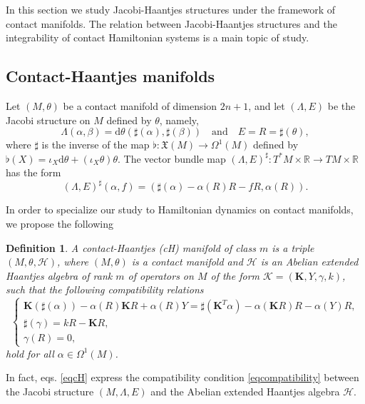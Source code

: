 \documentclass[10pt]{amsart}
\numberwithin{equation}{section}
\newcommand{\rd}{\mathrm{d}}
\newcommand{\bs}{\boldsymbol}
\newtheorem{definition}{Definition}
\theoremstyle{definition}
\begin{document}
In this section we study Jacobi-Haantjes structures under the framework of contact manifolds. The relation between Jacobi-Haantjes structures and the integrability of contact Hamiltonian systems is a main topic of study.



\subsection{Contact-Haantjes manifolds}
Let $(M,\theta)$ be a contact manifold of dimension $2n+1$, and let $(\Lambda,E)$ be the Jacobi structure on $M$ defined by $\theta$, namely,
\begin{equation}
\Lambda(\alpha,\beta)=\rd \theta(\sharp(\alpha),\sharp(\beta))\quad\text{and}\quad E=R=\sharp(\theta),
\end{equation}
where $\sharp$ is the inverse of the map $\flat:\mathfrak{X}(M)\longrightarrow\Omega^{1}(M)$ defined by $\flat(X)=\iota_{X} \rd \theta +(\iota_{X} \theta) \theta.$ The vector bundle map $(\Lambda, E)^{\sharp}: T^{*}M\times \mathbb{R}\to TM\times \mathbb{R}$ has the form
\begin{equation}
(\Lambda, E)^{\sharp}(\alpha,f)=(\sharp(\alpha)-\alpha(R)R-fR,\alpha(R)).
\end{equation}

\vspace{2mm}

In order to specialize our study to Hamiltonian dynamics on contact manifolds, we propose the following
\begin{definition}
\label{decH}
A contact-Haantjes (cH) manifold of class $m$ is a triple $(M,\theta,\mathscr{H})$, where $(M,\theta)$ is a contact manifold and $\mathscr{H}$ is an Abelian extended Haantjes algebra of rank $m$ of operators on $M$ of the form $\bs{\mathcal{K}}=(\bs{K}, Y, \gamma, k)$,  such that the following compatibility relations
\begin{equation}
\label{eqcH}
\left\lbrace \begin{array}{c}
\bs{K}(\sharp(\alpha))-\alpha(R)\bs{K}R+\alpha(R)Y=\sharp(\bs{K}^{T}\alpha)-\alpha(\bs{K}R)R-\alpha(Y)R,\\
\sharp(\gamma)=kR-\bs{K}R,\\
\gamma(R)=0,
\end{array} \right. 
\end{equation}
hold for all $\alpha\in\Omega^{1}(M)$.
\end{definition}
In fact, eqs. \eqref{eqcH} express the compatibility condition \eqref{eqcompatibility} between the Jacobi structure $(M,\Lambda,E)$ and the Abelian extended Haantjes algebra $\mathscr{H}$.
\vspace{2mm}
\end{document}
